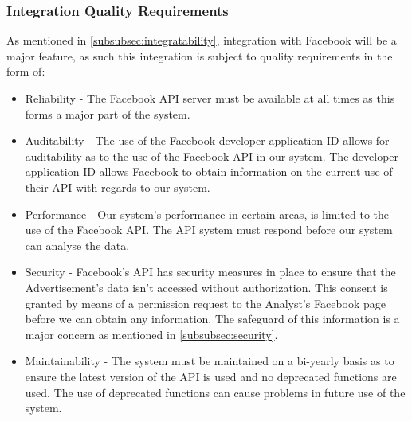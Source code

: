 \documentclass{article}
\begin{document}
		\subsubsection{Integration Quality Requirements}
		As mentioned in \ref{subsubsec:integratability}, integration with Facebook will be a major feature, as such this integration is subject to quality requirements in the form of:
		\begin{itemize}
			\item Reliability - The Facebook API server must be available at all times as this forms a major part of the system.
			\item Auditability - The use of the Facebook developer application ID allows for auditability as to the use of the Facebook API in our system. The developer application ID allows Facebook to obtain information on the current use of their API with regards to our system.
			\item Performance - Our system's performance in certain areas, is limited to the use of the Facebook API. The API system must respond before our system can analyse the data.
			\item Security - Facebook's API has security measures in place to ensure that the Advertisement's data isn't accessed without authorization. This consent is granted by means of a permission request to the Analyst's Facebook page before we can obtain any information. The safeguard of this information is a major concern as mentioned in \ref{subsubsec:security}.
			\item Maintainability - The system must be maintained on a bi-yearly basis as to ensure the latest version of the API is used and no deprecated functions are used. The use of deprecated functions can cause problems in future use of the system.
		\end{itemize}

	
\end{document}
